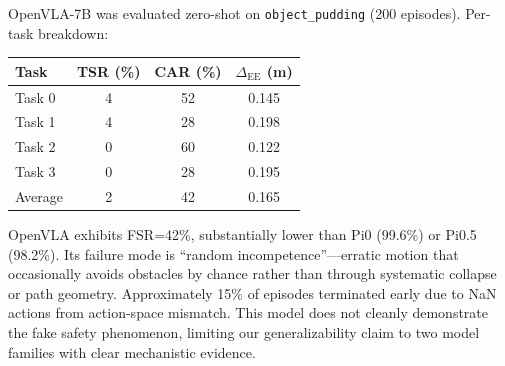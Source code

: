 \documentclass[letterpaper]{article}
\begin{document}
OpenVLA-7B was evaluated zero-shot on \texttt{object\_pudding} (200 episodes). Per-task breakdown:

\begin{table}[h]
\centering
\begin{tabular}{lccc}
\toprule
Task & TSR (\%) & CAR (\%) & $\Delta_{\text{EE}}$ (m) \\
\midrule
Task 0 & 4 & 52 & 0.145 \\
Task 1 & 4 & 28 & 0.198 \\
Task 2 & 0 & 60 & 0.122 \\
Task 3 & 0 & 28 & 0.195 \\
\midrule
Average & 2 & 42 & 0.165 \\
\bottomrule
\end{tabular}
\end{table}

OpenVLA exhibits FSR=42\%, substantially lower than Pi0 (99.6\%) or Pi0.5 (98.2\%). Its failure mode is ``random incompetence''---erratic motion that occasionally avoids obstacles by chance rather than through systematic collapse or path geometry. Approximately 15\% of episodes terminated early due to NaN actions from action-space mismatch. This model does not cleanly demonstrate the fake safety phenomenon, limiting our generalizability claim to two model families with clear mechanistic evidence.
\end{document}
